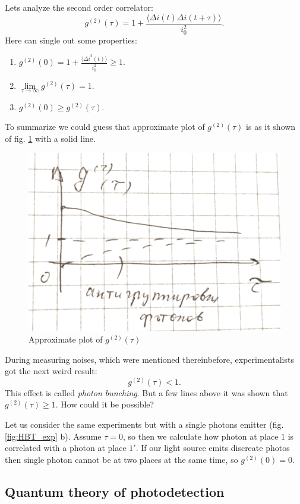 Lets analyze the second order correlator:
\begin{equation}
	g^{(2)} (\tau) = 1 + \frac{\langle \Delta i(t) \Delta i (t + \tau) \rangle}{i_0^2}.
\end{equation}
Here can single out some properties:
\begin{enumerate}
	\item $g^{(2)}(0) = 1 + \frac{\langle \Delta i^2 (t) \rangle}{i_0^2} \geq 1 $.
	\item $\lim\limits_{\tau \to \infty} g^{(2)}(\tau) = 1$.
	\item $g^{(2)}(0) \geq g^{(2)}(\tau)$. 
\end{enumerate}
To summarize we could guess that approximate plot of $g^{(2)}(\tau)$ is as it shown of fig. \ref{fig:g2tau_apprx} with a solid line.
\begin{figure}[h!]
	\centering
	\includegraphics[width=0.5\linewidth]{fig/L3/g2tau_apprx}
	\caption{Approximate plot of $g^{(2)}(\tau)$}
	\label{fig:g2tau_apprx}
\end{figure}

During measuring noises, which were mentioned thereinbefore, experimentalists got the next weird result:
\begin{equation}
	g^{(2)}(\tau) < 1.
\end{equation}
This effect is called \textit{photon bunching}. But a few lines above it was shown that $g^{(2)}(\tau) \geq 1$. How could it be possible? 

Let us consider the same experiments but with a single photons emitter (fig. \ref{fig:HBT_exp} b). Assume $\tau = 0$, so then we calculate how photon at place $1$ is correlated with a photon at place $1'$. If our light source emits discreate photos then single photon cannot be at two places at the same time, so $g^{(2)}(0) = 0$.

\subsection{Quantum theory of photodetection}

